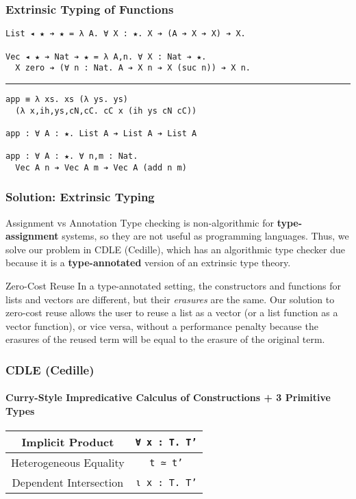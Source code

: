 \documentclass[mathserif,usenames,dvipsnames]{beamer}
\begin{document}
\begin{frame}[fragile]
\frametitle{Extrinsic Typing of Functions}

\begin{verbatim}
List ◂ ★ ➔ ★ = λ A. ∀ X : ★. X ➔ (A ➔ X ➔ X) ➔ X.

Vec ◂ ★ ➔ Nat ➔ ★ = λ A,n. ∀ X : Nat ➔ ★.
  X zero ➔ (∀ n : Nat. A ➔ X n ➔ X (suc n)) ➔ X n.
\end{verbatim}

\noindent\rule{\textwidth}{1pt}

\begin{verbatim}
app ≡ λ xs. xs (λ ys. ys) 
  (λ x,ih,ys,cN,cC. cC x (ih ys cN cC))

app : ∀ A : ★. List A ➔ List A ➔ List A

app : ∀ A : ★. ∀ n,m : Nat. 
  Vec A n ➔ Vec A m ➔ Vec A (add n m)
\end{verbatim}

\end{frame}

\begin{frame}[fragile]
\frametitle{Solution: Extrinsic Typing}

\begin{block}{Assignment vs Annotation}
Type checking is non-algorithmic for \textbf{type-assignment} systems, so they
are not useful as programming languages. Thus, we solve our problem in
CDLE (Cedille), which has an algorithmic type checker due because it
is a \textbf{type-annotated} version of an extrinsic type theory.
\end{block}

\begin{block}{Zero-Cost Reuse}
In a type-annotated setting, the constructors and functions for lists
and vectors are different, but their \textit{erasures} are the
same. Our solution to zero-cost reuse allows the user to reuse a list
as a vector (or a list function as a vector function), or vice versa,
without a performance penalty because the erasures of the reused term
will be equal to the erasure of the original term.
\end{block}

\end{frame}

\begin{frame}
\frametitle{CDLE (Cedille)}
\framesubtitle{Curry-Style Impredicative Calculus of Constructions + 3 Primitive Types}

\begin{center}
\begin{tabular}{ |c||c| } 
 \hline
 Implicit Product & \texttt{∀ x : T. T'} \\
 \hline
 Heterogeneous Equality & \texttt{t ≃ t'} \\
 \hline
 Dependent Intersection & \texttt{ι x : T. T'} \\
 \hline
\end{tabular}
\end{center}

\end{frame}
\end{document}
